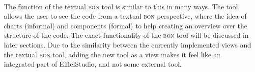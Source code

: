 \paragraph{}
The function of the textual \textsc{bon} tool is similar to this in many ways. The tool allows the user to see the code from a textual \textsc{bon} perspective, where the idea of charts (informal) and components (formal) to help creating an overview over the structure of the code. The exact functionality of the \textsc{bon} tool will be discussed in later sections. Due to the similarity between the currently implemented views and the textual \textsc{bon} tool, adding the new tool as a view makes it feel like an integrated part of EiffelStudio, and not some external tool.

